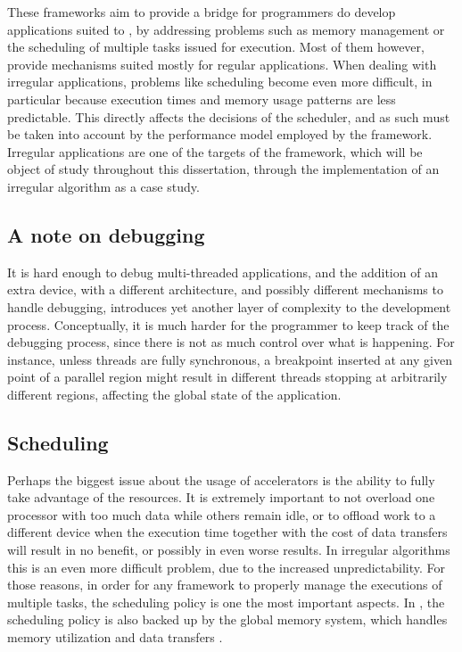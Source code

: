 \documentclass[main.tex]{subfiles}
\begin{document}
These frameworks aim to provide a bridge for programmers do develop applications suited to \hetplat, by addressing problems such as memory management or the scheduling of multiple tasks issued for execution. Most of them however, provide mechanisms suited mostly for regular applications. When dealing with irregular applications, problems like scheduling become even more difficult, in particular because execution times and memory usage patterns are less predictable. This directly affects the decisions of the scheduler, and as such must be taken into account by the performance model employed by the framework. Irregular applications are one of the targets of the \gama framework, which will be object of study throughout this dissertation, through the implementation of an irregular algorithm as a case study.

\subsection{A note on debugging}

It is hard enough to debug multi-threaded \cpu applications, and the addition of an extra device, with a different architecture, and possibly different mechanisms to handle debugging, introduces yet another layer of complexity to the development process. Conceptually, it is much harder for the programmer to keep track of the debugging process, since there is not as much control over what is happening. For instance, unless threads are fully synchronous, a breakpoint inserted at any given point of a parallel region might result in different threads stopping at arbitrarily different regions, affecting the global state of the application.

\subsection{Scheduling}

Perhaps the biggest issue about the usage of accelerators is the ability to fully take advantage of the resources. It is extremely important to not overload one processor with too much data while others remain idle, or to offload work to a different device when the execution time together with the cost of data transfers will result in no benefit, or possibly in even worse results. In irregular algorithms this is an even more difficult problem, due to the increased unpredictability.
For those reasons, in order for any \hetplat framework to properly manage the executions of multiple tasks, the scheduling policy is one the most important aspects. In \gama, the scheduling policy is also backed up by the global memory system, which handles memory utilization and data transfers \cite{thesisMariano12,artur2012gama,ricardo2012gama}.
\end{document}
